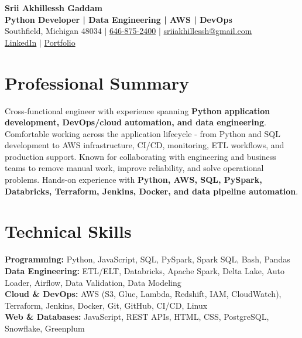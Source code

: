 \documentclass[letterpaper,10pt]{article}
\begin{document}
\fontsize{9.35pt}{10.45pt}\selectfont

\begin{center}
    {\LARGE \textbf{Srii Akhillessh Gaddam}} \\[-1pt]
    \textbf{Python Developer | Data Engineering | AWS | DevOps} \\[2pt]
    Southfield, Michigan 48034 $|$
    \href{tel:6468752400}{646-875-2400} $|$
    \href{mailto:sriiakhillessh@gmail.com}{sriiakhillessh@gmail.com} \\[1pt]
    \href{https://www.linkedin.com/in/srii-akhiilessh-gaddam-b48668191/}{LinkedIn} $|$
    \href{https://sriiakhillesshg.github.io/portfolio/}{Portfolio}
\end{center}
\vspace{-8pt}

\section{Professional Summary}
\small{Cross-functional engineer with experience spanning \textbf{Python application development, DevOps/cloud automation, and data engineering}. Comfortable working across the application lifecycle - from Python and SQL development to AWS infrastructure, CI/CD, monitoring, ETL workflows, and production support. Known for collaborating with engineering and business teams to remove manual work, improve reliability, and solve operational problems. Hands-on experience with \textbf{Python, AWS, SQL, PySpark, Databricks, Terraform, Jenkins, Docker, and data pipeline automation}.}

\section{Technical Skills}
\small{
\textbf{Programming:} Python, JavaScript, SQL, PySpark, Spark SQL, Bash, Pandas \\
\textbf{Data Engineering:} ETL/ELT, Databricks, Apache Spark, Delta Lake, Auto Loader, Airflow, Data Validation, Data Modeling \\
\textbf{Cloud \& DevOps:} AWS (S3, Glue, Lambda, Redshift, IAM, CloudWatch), Terraform, Jenkins, Docker, Git, GitHub, CI/CD, Linux \\
\textbf{Web \& Databases:} JavaScript, REST APIs, HTML, CSS, PostgreSQL, Snowflake, Greenplum
}
\end{document}
